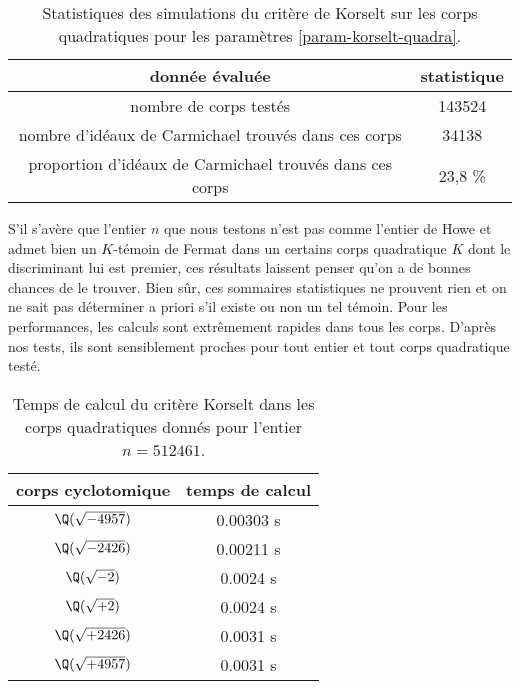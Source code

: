 \begin{table}[H]
	\begin{center}
		\begin{tabular}{|c|c|}
			\hline
			donnée évaluée & statistique \\
			\hline
			\hline
			nombre de corps testés & 143524 \\\hline
			nombre d'idéaux de Carmichael trouvés dans ces corps & 34138 \\\hline
			proportion d'idéaux de Carmichael trouvés dans ces corps & 23,8 \% \\\hline
		\end{tabular}
		\caption{Statistiques des simulations du critère de Korselt sur les corps quadratiques pour les paramètres \ref{param-korselt-quadra}.}
	\end{center}
\end{table}

S'il s'avère que l'entier $n$ que nous testons n'est pas comme l'entier de Howe et admet bien un $K$-témoin de Fermat dans un certains corps quadratique $K$ dont le discriminant lui est premier, ces résultats laissent penser qu'on a de bonnes chances de le trouver. Bien sûr, ces sommaires statistiques ne prouvent rien et on ne sait pas déterminer a priori s'il existe ou non un tel témoin. Pour les performances, les calculs sont extrêmement rapides dans tous les corps. D'après nos tests, ils sont sensiblement proches pour tout entier et tout corps quadratique testé.

\begin{table}[H]
	\begin{center}
		\begin{tabular}{|c|c|}
			\hline
			corps cyclotomique & temps de calcul \\
			\hline
			\hline
			$\Q(\sqrt{-4957})$ & 0.00303 s \\\hline
			$\Q(\sqrt{-2426})$ & 0.00211 s \\\hline
			$\Q(\sqrt{-2})$ & 0.0024 s \\\hline
			$\Q(\sqrt{+2})$ & 0.0024 s \\\hline
			$\Q(\sqrt{+2426})$ & 0.0031 s \\\hline
			$\Q(\sqrt{+4957})$ & 0.0031 s \\\hline
		\end{tabular}
		\caption{Temps de calcul du critère Korselt dans les corps quadratiques donnés pour l'entier $n=512461$.}
	\end{center}
\end{table}
